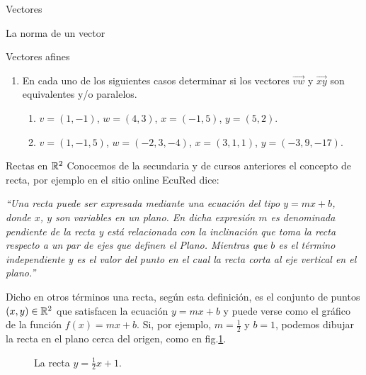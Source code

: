 \begin{chapter}{Vectores}
\begin{section}{La norma de un vector}
\begin{section}{Vectores afines}
    \begin{enumerate}

        \item En  cada uno de los siguientes casos determinar si los
        vectores  $\overrightarrow{vw}$ y $\overrightarrow{xy}$ son
        equivalentes y/o paralelos.
        \begin{enumerate}
        \item   $v=(1,-1)$,  $w=(4,3)$, $x=(-1,5)$, $y=(5,2)$. 
        \item   $v=(1,-1,5)$,  $w=(-2,3,-4)$,  $x=(3,1,1)$,  $y=(-3,9,-17)$.
        \end{enumerate}
        
    \end{enumerate}
    \end{section}




    \end{section}

    \begin{section}{Rectas en $\mathbb R^2$}\label{seccion-rectas-en-r2}
    Conocemos de la secundaria y de cursos anteriores el concepto de recta, por ejemplo en el  sitio online EcuRed dice: 
    
    \textit{``Una recta puede ser expresada mediante una ecuación del tipo $y = m x + b$, donde $x$, $y$ son variables en un plano. En dicha expresión $m$ es denominada pendiente de la recta y está relacionada con la inclinación que toma la recta respecto a un par de ejes que definen el Plano. Mientras que $b$ es el término independiente y es el valor del punto en el cual la recta corta al eje vertical en el plano.''}
    
    Dicho en otros términos una recta,  según esta definición, es el conjunto de puntos $(x,y) \in \mathbb R^2$ que satisfacen la ecuación $y = m x + b$ y puede verse como el gráfico de la función $f(x) = m x + b$. Si, por ejemplo, $m=\frac12$ y $b=1$, podemos dibujar la recta en el plano cerca del origen, como en fig.\ref{fig-recta-funcion}.
    \begin{figure}[h]
    	\centering
        \caption{La recta $y = \frac12x +1$.}
        \label{fig-recta-funcion}
    \end{figure} 
    

\end{section}
\end{chapter}
